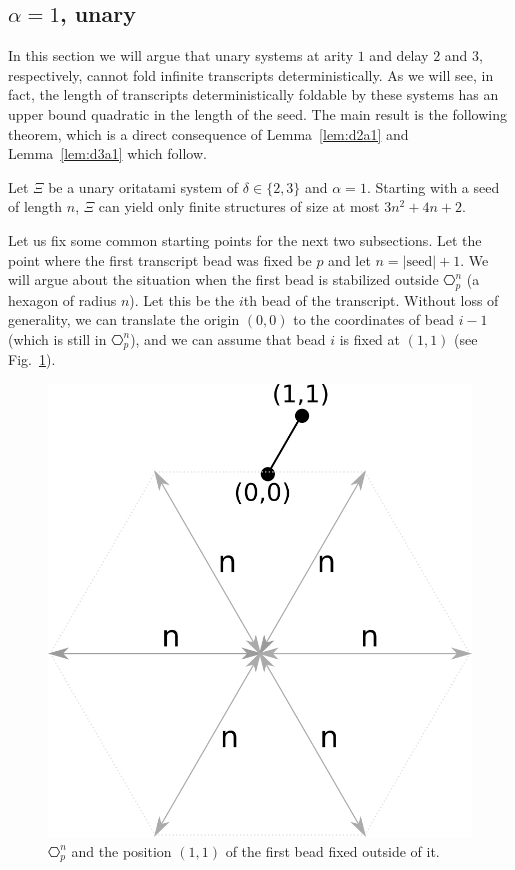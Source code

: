 

\subsection{$\alpha = 1$, unary}
\label{sec:unary}

In this section we will argue that unary systems at arity $1$ and delay $2$ and $3$, respectively, cannot fold infinite transcripts deterministically. As we will see, in fact, the length of transcripts deterministically foldable by these systems has an upper bound quadratic in the length of the seed. The main result is the following theorem, which is a direct consequence of Lemma~\ref{lem:d2a1}  and Lemma~\ref{lem:d3a1} which follow.
\begin{theorem}[$\delta\in\{ 2,3\}, \alpha = 1$]\label{thm:d23a1}
	Let $\Xi$ be a unary oritatami system of $\delta \in \{2,3\}$ and $\alpha = 1$. Starting with a seed of length $n$, $\Xi$ can yield only finite structures of size at most $3n^2+4n+2$.
\end{theorem}

Let us fix some common starting points for the next two subsections. Let the point where the first transcript bead was fixed be $p$ and let $n=|\mathrm{seed}|+1$. We will argue about the situation when the first bead is stabilized outside $\hexagon_p^n$ (a hexagon of radius $n$). Let this be the $i$th bead of the transcript. Without loss of generality, we can translate the origin $(0,0)$ to the coordinates of bead $i-1$ (which is still in $\hexagon_p^n$), and we can assume that bead $i$ is fixed at $(1,1)$ (see Fig.~\ref{fig:hexagonOut}).
\begin{figure}
	\centering
	\includegraphics[width=0.3\linewidth]{./Fig/hexagonOut}
	\caption{$\hexagon_p^n$ and the position $(1,1)$ of the first bead fixed outside of it.}
	\label{fig:hexagonOut}
\end{figure}


